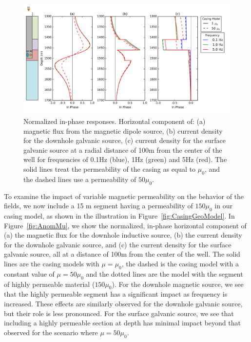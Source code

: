 \documentclass{segabs}
\begin{document}
\begin{figure}[h!]
	\centering
	\includegraphics[width=1\columnwidth]{./Figures/VaryFreq}
	\caption{Normalized in-phase responses. Horizontal component of:  (a) magnetic flux from the magnetic dipole source, (b) current density for the downhole galvanic source, (c) current density for the surface galvanic source at a radial distance of 100m from the center of the well for frequencies of 0.1Hz (blue), 1Hz (green)  and 5Hz (red). The solid lines treat the permeability of the casing as equal to $\mu_0$, and the dashed lines use a permeability of $50 \mu_0$. }
	\label{fig:varyFreq}
\end{figure}
To examine the impact of variable magnetic permeability on the behavior of the fields, we now include a 15 m segment having a permeability of $150 \mu_0$ in our casing model, as shown in the illustration in Figure~\ref{fig:CasingGeoModel}. In Figure~\ref{fig:AnomMu}, we show the normalized, in-phase horizontal component of (a) the magnetic flux for the downhole inductive source, (b) the current density for the downhole galvanic source, and (c) the current density for the surface galvanic source, all at a distance of 100m from the center of the well. The solid lines are the casing models with $\mu = \mu_0$, the dashed is the casing model with a constant value of $\mu = 50 \mu_0$ and the dotted lines are the model with the segment of highly permeable material ($150 \mu_0$). For the downhole magnetic source, we see that the highly permeable segment has a significant impact as frequency is increased. These effects are similarly observed for the downhole galvanic source, but their role is less pronounced. For the surface galvanic source, we see that including a highly permeable section at depth has minimal impact beyond that observed for the scenario where $\mu = 50\mu_0$.
\end{document}
